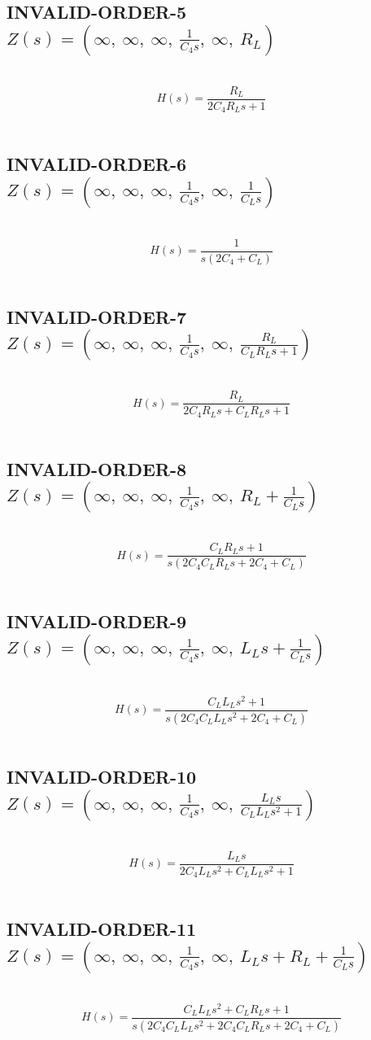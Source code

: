 \documentclass{article}
\begin{document}
\subsection{INVALID-ORDER-5 $Z(s) = \left( \infty, \  \infty, \  \infty, \  \frac{1}{C_{4} s}, \  \infty, \  R_{L}\right)$ } \ 
\textbf{\[H(s) = \frac{R_{L}}{2 C_{4} R_{L} s + 1}\] } \ 
\subsection{INVALID-ORDER-6 $Z(s) = \left( \infty, \  \infty, \  \infty, \  \frac{1}{C_{4} s}, \  \infty, \  \frac{1}{C_{L} s}\right)$ } \ 
\textbf{\[H(s) = \frac{1}{s \left(2 C_{4} + C_{L}\right)}\] } \ 
\subsection{INVALID-ORDER-7 $Z(s) = \left( \infty, \  \infty, \  \infty, \  \frac{1}{C_{4} s}, \  \infty, \  \frac{R_{L}}{C_{L} R_{L} s + 1}\right)$ } \ 
\textbf{\[H(s) = \frac{R_{L}}{2 C_{4} R_{L} s + C_{L} R_{L} s + 1}\] } \ 
\subsection{INVALID-ORDER-8 $Z(s) = \left( \infty, \  \infty, \  \infty, \  \frac{1}{C_{4} s}, \  \infty, \  R_{L} + \frac{1}{C_{L} s}\right)$ } \ 
\textbf{\[H(s) = \frac{C_{L} R_{L} s + 1}{s \left(2 C_{4} C_{L} R_{L} s + 2 C_{4} + C_{L}\right)}\] } \ 
\subsection{INVALID-ORDER-9 $Z(s) = \left( \infty, \  \infty, \  \infty, \  \frac{1}{C_{4} s}, \  \infty, \  L_{L} s + \frac{1}{C_{L} s}\right)$ } \ 
\textbf{\[H(s) = \frac{C_{L} L_{L} s^{2} + 1}{s \left(2 C_{4} C_{L} L_{L} s^{2} + 2 C_{4} + C_{L}\right)}\] } \ 
\subsection{INVALID-ORDER-10 $Z(s) = \left( \infty, \  \infty, \  \infty, \  \frac{1}{C_{4} s}, \  \infty, \  \frac{L_{L} s}{C_{L} L_{L} s^{2} + 1}\right)$ } \ 
\textbf{\[H(s) = \frac{L_{L} s}{2 C_{4} L_{L} s^{2} + C_{L} L_{L} s^{2} + 1}\] } \ 
\subsection{INVALID-ORDER-11 $Z(s) = \left( \infty, \  \infty, \  \infty, \  \frac{1}{C_{4} s}, \  \infty, \  L_{L} s + R_{L} + \frac{1}{C_{L} s}\right)$ } \ 
\textbf{\[H(s) = \frac{C_{L} L_{L} s^{2} + C_{L} R_{L} s + 1}{s \left(2 C_{4} C_{L} L_{L} s^{2} + 2 C_{4} C_{L} R_{L} s + 2 C_{4} + C_{L}\right)}\] } \ 
\end{document}
